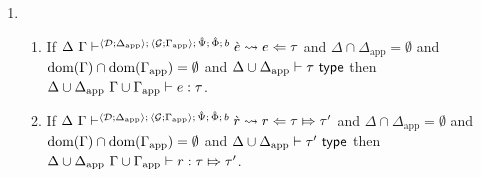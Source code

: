 \begin{theorem}
\begin{enumerate}
\begin{enumerate}
\begin{enumerate}
    \end{enumerate}
    \item \begin{enumerate}
      \item If $\Delta~\Gamma \vdash^{\langle \mathcal{D}; \Delta_\text{app} \rangle;\,\langle \mathcal{G}; \Gamma_\text{app} \rangle;\,\hat{\Psi};\,\hat\Phi;\,b} \grave{e} \leadsto e \Leftarrow \tau$ and $\Delta \cap \Delta_\text{app}=\emptyset$ and $\text{dom}(\Gamma) \cap \text{dom}(\Gamma_\text{app})=\emptyset$ and ${\Delta}\cup{\Delta_\text{app}} \vdash \tau~\mathsf{type}$ then ${\Delta}\cup{\Delta_\text{app}}~{\Gamma}\cup{\Gamma_\text{app}} \vdash e : \tau$. 
      \item If $\Delta~\Gamma \vdash^{\langle \mathcal{D}; \Delta_\text{app} \rangle;\,\langle \mathcal{G}; \Gamma_\text{app} \rangle;\,\hat{\Psi};\,\hat\Phi;\,b} \grave{r} \leadsto r \Leftarrow \tau \Mapsto \tau'$ and $\Delta \cap \Delta_\text{app}=\emptyset$ and $\text{dom}(\Gamma) \cap \text{dom}(\Gamma_\text{app})=\emptyset$ and ${\Delta}\cup{\Delta_\text{app}} \vdash \tau'~\mathsf{type}$ then ${\Delta}\cup{\Delta_\text{app}}~{\Gamma}\cup{\Gamma_\text{app}} \vdash r : \tau \Mapsto \tau'$.
    \end{enumerate}
  \end{enumerate}
\end{enumerate}
\end{theorem}
